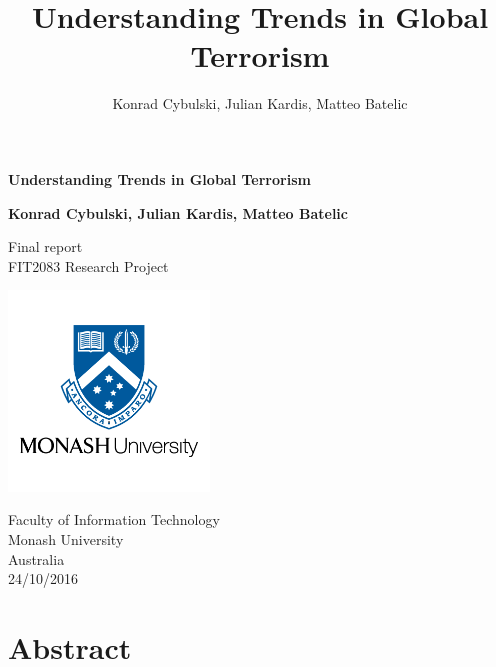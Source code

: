 \documentclass[10pt,a4paper]{article}
\author{Konrad Cybulski, Julian Kardis, Matteo Batelic}
\title{Understanding Trends in Global Terrorism}
\begin{document}
\begin{titlepage}
    \begin{center}
        \vspace*{1cm}
        
        \LARGE
        \textbf{Understanding Trends in Global Terrorism}
        
        \vspace{4cm}
        
		\Large 
        
        \textbf{Konrad Cybulski, Julian Kardis, Matteo Batelic}
        
        
        \LARGE
        \vspace{2cm}

        
        
        \vfill
        
        
        
        Final report \\
        FIT2083 Research Project
        
        
        \includegraphics[width=0.4\textwidth]{monash-university-logo.png}
              
        
        \large
        Faculty of Information Technology\\
        Monash University\\
        Australia\\
        24/10/2016
        
    \end{center}
\end{titlepage}

\pagebreak
\tableofcontents
\pagebreak

\section{Abstract} 
\end{document}
